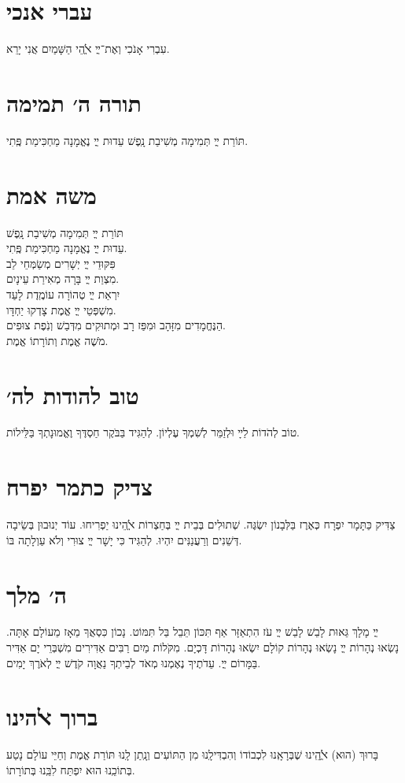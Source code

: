 \documentclass{songsheet}
\begin{document}
\section{עברי אנכי}
עִבְרִי אָנֹכִי וְאֶת־ײֳ ﭏֱֺהֵי הַשָּׁמַיִם אֲנִי יָרֵא.
\section{תורה ה׳ תמימה}
תּוֹרַת ײֳ תְּמִימָה מְשִׁיבַת נָֽפֶשׁ עֵדוּת ײֳ נֶאֱמָנָה מַחְכִּימַת פֶּֽתִי.
\section{משה אמת}
תּוֹרַת ײֳ תְּמִימָה מְשִׁיבַת נָֽפֶשׁ\\עֵדוּת ײֳ נֶאֱמָנָה מַחְכִּימַת פֶּֽתִי.\\פִּקּוּדֵי ײֳ יְשָׁרִים מְשַׂמְּחֵי לֵב\\מִצְוַת ײֳ בָּרָה מְאִירַת עֵינָיִם.\\יִרְאַת ײֳ טְהוֹרָה עוֹמֶֽדֶת לָעַד\\מִשְׁפְּטֵי ײֳ אֱמֶת צָדְקוּ יַחְדָּו.\\הַנֶּחֱמָדִים מִזָּהָב וּמִפַּז רָב וּמְתוּקִים מִדְּבַשׁ וְנֹֽפֶת צוּפִים.\\
מֺשֶׁה אֱמֶת וְתוֹרָתוֹ אֱמֶת.
\section{טוב להודות לה׳}
טוֹב לְהֹדוֹת לַײָ וּלְזַמֵּר לְשִׁמְךָ עֶלְיוֹן. לְהַגִּיד בַּבֹּקֶר חַסְדֶּךָ וֶאֱמוּנָתְךָ בַּלֵּילוֹת.
\section{צדיק כתמר יפרח}
צַדִּיק כַּתָּמָר יִפְרָח כְּאֶרֶז בַּלְּבָנוֹן יִשְׂגֶּה. שְׁתוּלִים בְּבֵית ײֳ בְּחַצְרוֹת ﭏֱֺהֵינוּ יַפְרִיחוּ. עוֹד יְנוּבוּן בְּשֵׂיבָה דְּשֵׁנִים וְרַעֲנַנִּים יִהְיוּ. לְהַגִּיד כִּי יָשָׁר ײֳ צוּרִי וְלֹא עַוְלָתָה בּוֹ.
\section{ה׳ מלך}
ײֳ מָלָךְ גֵּאוּת לָבֵשׁ לָבֵשׁ ײֳ עֹז הִתְאַזָּר אַף תִּכּוֹן תֵּבֵל בַּל תִּמּוֹט. נָכוֹן כִּסְאֲךָ מֵאָז מֵעוֹלָם אָתָּה. נָשְׂאוּ נְהָרוֹת ײֳ נָשְׂאוּ נְהָרוֹת קוֹלָם יִשְׂאוּ נְהָרוֹת דָּכְיָם. מִקֹּלוֹת מַיִם רַבִּים אַדִּירִים מִשְׁבְּרֵי יָם אַדִּיר בַּמָּרוֹם ײֳ. עֵדֹתֶיךָ נֶאֶמְנוּ מְאֹד לְבֵיתְךָ נַאֲוָה קֹדֶשׁ ײֳ לְאֹרֶךְ יָמִים.
\section{ברוך ﭏהינו}
בָּרוּךְ (הוּא) ﭏֱֺהֵֽינוּ שֶׁבְּרָאָֽנוּ לִכְבוֹדוֹ וְהִבְדִּילָֽנוּ מִן הַתּוֹעִים וְנָֽתַן לָֽנוּ תּוֹרַת אֱמֶת וְחַיֵּי עוֹלָם נָטַע בְּתוֹכֵֽנוּ הוּא יִפְתַּח לִבֵּֽנוּ בְּתוֹרָתוֹ.
\end{document}
